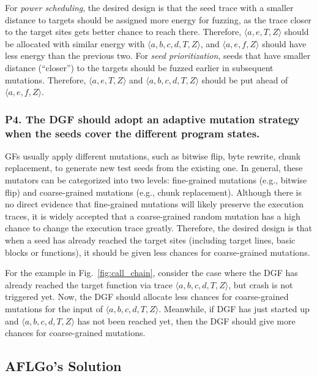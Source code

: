  For \emph{power scheduling}, the desired design is that the seed trace with a smaller distance to targets should be assigned more energy for fuzzing, as the trace closer to the target sites gets better chance to reach there. Therefore, $\langle a, e, T, Z\rangle$ should be allocated with similar energy with $\langle a, b, c, d, T, Z\rangle$, and $\langle a, e, f, Z\rangle$ should have less energy than the previous two. For \emph{seed prioritization}, seeds that have smaller distance (``closer'') to the targets should be fuzzed earlier in subsequent mutations. Therefore, $\langle a, e, T, Z\rangle$ and $\langle a, b, c, d, T, Z\rangle$ should be put ahead of $\langle a, e, f, Z\rangle$.

\subsubsection{\textbf{P4}. The DGF should adopt an \textbf{adaptive} mutation strategy when the seeds cover the different program states.}  \label{subsec:p4}
 GFs usually apply different mutations, such as bitwise flip, byte rewrite, chunk replacement, to generate new test seeds from the existing one. 
In general, these mutators can be categorized into two levels: fine-grained mutations (e.g., bitwise flip) and coarse-grained mutations (e.g., chunk replacement).
 Although there is no direct evidence that fine-grained mutations will likely preserve the execution traces, it is widely accepted that a coarse-grained random mutation has a high chance to change the execution trace greatly. Therefore, the desired design is that when a seed has already reached the target sites (including target lines, basic blocks or functions), it should be given less chances for coarse-grained mutations.
 
For the example in Fig.~\ref{fig:call_chain}, consider the case where the DGF has already reached the target function via trace $\langle a, b, c, d, T, Z\rangle $, but crash is not triggered yet.
Now, the DGF should allocate less chances for coarse-grained mutations for the input of $\langle a, b, c, d, T, Z\rangle $.
Meanwhile, if DGF has just started up and $\langle a, b, c, d, T, Z\rangle $ has not been reached yet, then the DGF should give more chances for coarse-grained mutations.
%
 







\subsection{AFLGo's Solution} \label{subsec:aflgo_sol}



